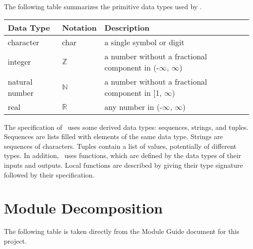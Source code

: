 \documentclass[12pt, titlepage]{article}
\begin{document}
The following table summarizes the primitive data types used by \progname.

\begin{center}
	\renewcommand{\arraystretch}{1.2}
	\noindent
	\begin{tabular}{l l p{7.5cm}}
		\toprule
		\textbf{Data Type} & \textbf{Notation} & \textbf{Description}                                             \\
		\midrule
		character          & char              & a single symbol or digit                                         \\
		integer            & $\mathbb{Z}$      & a number without a fractional component in (-$\infty$, $\infty$) \\
		natural number     & $\mathbb{N}$      & a number without a fractional component in [1, $\infty$)         \\
		real               & $\mathbb{R}$      & any number in (-$\infty$, $\infty$)                              \\
		\bottomrule
	\end{tabular}
\end{center}

\noindent
The specification of \progname \ uses some derived data types: sequences, strings, and
tuples. Sequences are lists filled with elements of the same data type. Strings
are sequences of characters. Tuples contain a list of values, potentially of
different types. In addition, \progname \ uses functions, which
are defined by the data types of their inputs and outputs. Local functions are
described by giving their type signature followed by their specification.

\section{Module Decomposition}

The following table is taken directly from the Module Guide document for this project.
\end{document}
